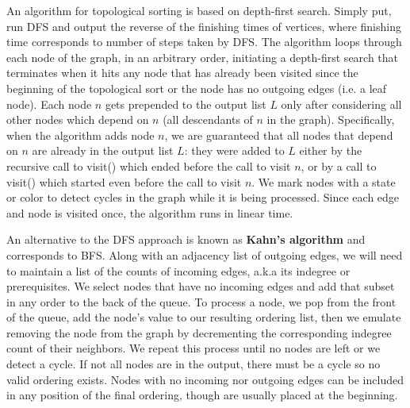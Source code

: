 \documentclass{article}
\begin{document}
    An algorithm for topological sorting is based on depth-first search. Simply put, run DFS and output the reverse of the finishing times of vertices, where finishing time corresponds to number of steps taken by DFS. The algorithm loops through each node of the graph, in an arbitrary order, initiating a depth-first search that terminates when it hits any node that has already been visited since the beginning of the topological sort or the node has no outgoing edges (i.e. a leaf node). Each node $n$ gets prepended to the output list $L$ only after considering all other nodes which depend on $n$ (all descendants of $n$ in the graph). Specifically, when the algorithm adds node $n$, we are guaranteed that all nodes that depend on $n$ are already in the output list $L$: they were added to $L$ either by the recursive call to visit() which ended before the call to visit $n$, or by a call to visit() which started even before the call to visit $n$. We mark nodes with a state or color to detect cycles in the graph while it is being processed. Since each edge and node is visited once, the algorithm runs in linear time. 

    An alternative to the DFS approach is known as \textbf{Kahn's algorithm} and corresponds to BFS. Along with an adjacency list of outgoing edges, we will need to maintain a list of the counts of incoming edges, a.k.a its indegree or prerequisites. We select nodes that have no incoming edges and add that subset in any order to the back of the queue. To process a node, we pop from the front of the queue, add the node's value to our resulting ordering list, then we emulate removing the node from the graph by decrementing the corresponding indegree count of their neighbors. We repeat this process until no nodes are left or we detect a cycle. If not all nodes are in the output, there must be a cycle so no valid ordering exists. Nodes with no incoming nor outgoing edges can be included in any position of the final ordering, though are usually placed at the beginning.
\end{document}
